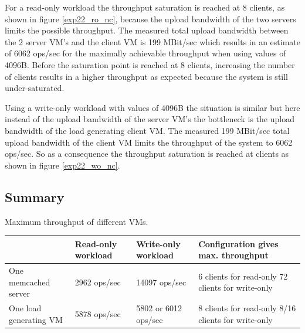 \documentclass[report.tex]{subfiles}
\begin{document}

For a read-only workload the throughput saturation is reached at 8 clients, as shown in figure \ref{exp22_ro_nc}, because the upload bandwidth of the two servers limits the possible throughput. The measured total upload bandwidth between the 2 server VM's and the client VM is 199 MBit/sec which results in an estimate of 6062 ops/sec for the maximally achievable throughput when using values of 4096B. Before the saturation point is reached at 8 clients, increasing the number of clients results in a higher throughput as expected because the system is still under-saturated. 

Using a write-only workload with values of 4096B the situation is similar but here instead of the upload bandwidth of the server VM's the bottleneck is the upload bandwidth of the load generating client VM. The measured 199 MBit/sec total upload bandwidth of the client VM limits the throughput of the system to 6062 ops/sec. So as a consequence  the throughput saturation is reached at  clients as shown in figure \ref{exp22_wo_nc}.


\subsection{Summary}


\begin{center}
	{Maximum throughput of different VMs.}
	\begin{tabular}{|l|p{2cm}|p{2cm}|p{4cm}|}
		\hline                        & Read-only workload & Write-only workload & Configuration gives max. throughput \\ 
		\hline One memcached server   & 2962 ops/sec       & 14097 ops/sec & 6 clients for read-only 72 clients for write-only\\ 
		\hline One load generating VM & 5878 ops/sec       &  5802 or 6012 ops/sec & 8 clients for read-only 8/16 clients for write-only\\ 
		\hline 
	\end{tabular}
\end{center}


\end{document}
